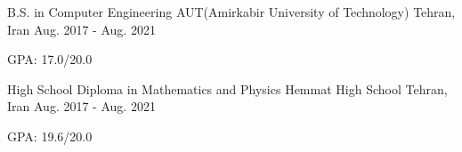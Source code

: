 

\begin{cventries}

    \cventry
    {B.S. in Computer Engineering} %
    {AUT(Amirkabir University of Technology)} %
    {Tehran, Iran} %
    {Aug. 2017 - Aug. 2021} %
    {
        \begin{cvitems} %
            \item {GPA: 17.0/20.0}
        \end{cvitems}
    }

    \cventry
    {High School Diploma in Mathematics and Physics} %
    {Hemmat High School} %
    {Tehran, Iran} %
    {Aug. 2017 - Aug. 2021} %
    {
        \begin{cvitems} %
            \item {GPA: 19.6/20.0}
        \end{cvitems}
    }

\end{cventries}